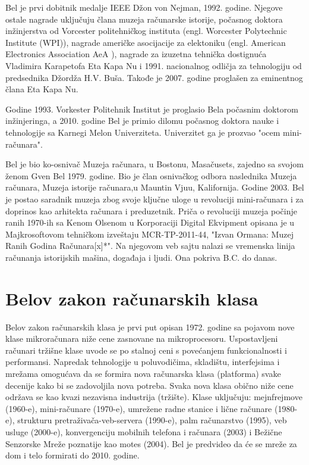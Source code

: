 \documentclass[a4paper]{article}
\begin{document}
{Bel je prvi dobitnik medalje IEEE Džon von Nejman, 1992. godine.\cite{bel4} Njegove ostale nagrade uključuju člana muzeja računarske istorije, počasnog doktora inžinjerstva od Vorcester politehničkog instituta (engl. Worcester Polytechnic Institute (WPI)), nagrade američke asocijacije za elektoniku (engl. American Electronics Association AeA ), nagrade za izuzetna tehnička dostignuća Vladimira Karapetofa Eta Kapa Nu i 1991. nacionalnog odličja za tehnologiju od predsednika Džordža H.V. Buša. \cite{bel5} Takođe je 2007. godine proglašen za eminentnog člana Eta Kapa Nu.

Godine 1993. Vorkester Politehnik Institut je proglasio Bela počasnim doktorom inžinjeringa, a 2010. godine Bel je primio dilomu počasnog doktora nauke i tehnologije sa Karnegi Melon Univerziteta. Univerzitet ga je prozvao "ocem mini-računara".

Bel je bio ko-osnivač Muzeja računara, u Bostonu, Masačusets, zajedno sa svojom ženom Gven Bel 1979. godine. Bio je član osnivačkog odbora naslednika Muzeja računara, Muzeja istorije računara,u Mauntin Vjuu, Kalifornija. Godine 2003. Bel je postao saradnik muzeja zbog svoje ključne uloge u revoluciji mini-računara i za doprinos kao arhitekta računara i preduzetnik.\cite{bel6} Priča o revoluciji muzeja počinje ranih 1970-ih sa Kenom Olsenom u Korporaciji Digital Ekvipment opisana je u Majkrosoftovom tehničkom izveštaju MCR-TP-2011-44, "Izvan Ormana: Muzej Ranih Godina Računara[x]*". \cite{bel7} Na njegovom veb sajtu \cite{bel8} nalazi se vremenska linija računanja istorijskih mašina, događaja i ljudi. Ona pokriva B.C. do danas.




\section{Belov zakon računarskih klasa}
\label{slike_i_tabele}

Belov zakon računarskih klasa \cite{bel9} je prvi put opisan 1972. godine sa pojavom nove klase mikroračunara niže cene zasnovane na mikroprocesoru. Uspostavljeni računari tržišne klase uvode se po stalnoj ceni s povećanjem funkcionalnosti i performansi. Napredak tehnologije u poluvodičima, skladištu, interfejsima i mrežama omogućava da se formira nova računarska klasa (platforma) svake decenije kako bi se zadovoljila nova potreba. Svaka nova klasa obično niže cene održava se kao kvazi nezavisna industrija (tržište). Klase uključuju: mejnfrejmove (1960-e), mini-računare (1970-e), umrežene radne stanice i lične računare (1980-e), strukturu pretraživača-veb-servera (1990-e), palm računarstvo (1995), veb usluge (2000-e), konvergenciju mobilnih telefona i računara (2003) i Bežične Senzorske Mreže poznatije kao motes (2004). Bel je predvideo da će se mreže za dom i telo formirati do 2010. godine.





}
\end{document}
